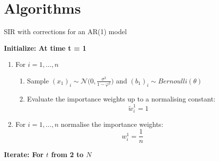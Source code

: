 \chapter{Algorithms}
\label{appen:algorithms}

\begin{algorithm}[H]
\caption{SIR with corrections for an AR(1) model}\label{euclid}
 \begin{algorithmic}

 \State  \bf{Initialize:} \normalfont At time t = 1
            
\begin{enumerate}
	\item For $i = 1, \dots , n$
	\begin{enumerate}
		\item Sample $(x_{1})_i \sim \mathcal{N} \Bigg (0, \frac{\sigma^2}{1- \varphi^2} \Bigg)$ and $(b_1)_i \sim Bernoulli(\theta)$
		\item Evaluate the importance weights up to a normalising constant:
		\[
		\tilde{w}^{1}_{i} = 1
		\]
	\end{enumerate}
	\item For $i = 1, \dots , n$ normalise the importance weights: 
	\[
	w^{1}_{i} = \frac{1}{n}
	\]
\end{enumerate}

 \State  \bf{Iterate:} \normalfont For $t$ from 2 to $N$


\end{algorithmic}
\end{algorithm}
